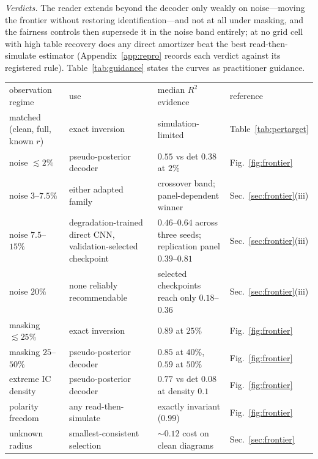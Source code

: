 \documentclass[aip,cha,amsmath,amssymb,reprint,floatfix]{revtex4-2}
\newcommand{\rtwo}{$R^2$}
\begin{document}
\emph{Verdicts.} The reader extends beyond the decoder only weakly on
noise---moving the frontier without restoring identification---and not at all
under masking, and the fairness controls then supersede it in the noise band
entirely; at no grid cell with high table recovery does any direct amortizer
beat the best read-then-simulate estimator (Appendix~\ref{app:repro} records
each verdict against its registered rule).
Table~\ref{tab:guidance} states the curves as practitioner guidance.

\begin{table}[t]
\centering
\footnotesize
\begin{ruledtabular}
\begin{tabular}{p{}p{}p{}p{}}
observation regime & use & median \rtwo{} evidence & reference \\
\colrule
matched (clean, full, known $r$) & exact inversion & simulation-limited & Table~\ref{tab:pertarget} \\
noise $\lesssim2\%$ & pseudo-posterior decoder & $0.55$ vs det $0.38$ at $2\%$ & Fig.~\ref{fig:frontier} \\
noise $3$--$7.5\%$ & either adapted family & crossover band; panel-dependent winner & Sec.~\ref{sec:frontier}(iii) \\
noise $7.5$--$15\%$ & degradation-trained direct CNN, validation-selected checkpoint & $0.46$--$0.64$ across three seeds; replication panel $0.39$--$0.81$ & Sec.~\ref{sec:frontier}(iii) \\
noise $20\%$ & none reliably recommendable & selected checkpoints reach only $0.18$--$0.36$ & Sec.~\ref{sec:frontier}(iii) \\
masking $\lesssim25\%$ & exact inversion & $0.89$ at $25\%$ & Fig.~\ref{fig:frontier} \\
masking $25$--$50\%$ & pseudo-posterior decoder & $0.85$ at $40\%$, $0.59$ at $50\%$ & Fig.~\ref{fig:frontier} \\
extreme IC density & pseudo-posterior decoder & $0.77$ vs det $0.08$ at density $0.1$ & Fig.~\ref{fig:frontier} \\
polarity freedom & any read-then-simulate & exactly invariant ($0.99$) & Fig.~\ref{fig:frontier} \\
unknown radius & smallest-consistent selection & ${\sim}0.12$ cost on clean diagrams & Sec.~\ref{sec:frontier} \\
\end{tabular}
\end{ruledtabular}

\end{table}
\end{document}
